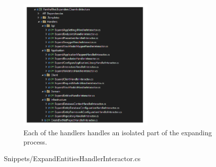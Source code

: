 \begin{figure}[H]
    \centering
    \includegraphics[width=0.6\textwidth]{Figures/expander_handlers.pdf}
    \caption[handlers]{Each of the handlers handles an isolated part of the expanding process.}
    \label{fig_handlers}
\end{figure}


    {Snippets/ExpandEntitiesHandlerInteractor.cs}
